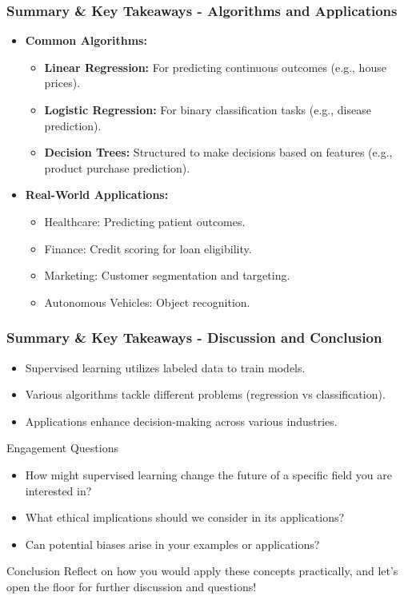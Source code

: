 \documentclass[aspectratio=169]{beamer}
\begin{document}
\begin{frame}[fragile]
    \frametitle{Summary \& Key Takeaways - Algorithms and Applications}
    \begin{itemize}
        \item \textbf{Common Algorithms:}
        \begin{itemize}
            \item \textbf{Linear Regression:} For predicting continuous outcomes (e.g., house prices).
            \item \textbf{Logistic Regression:} For binary classification tasks (e.g., disease prediction).
            \item \textbf{Decision Trees:} Structured to make decisions based on features (e.g., product purchase prediction).
        \end{itemize}
        
        \item \textbf{Real-World Applications:}
        \begin{itemize}
            \item Healthcare: Predicting patient outcomes.
            \item Finance: Credit scoring for loan eligibility.
            \item Marketing: Customer segmentation and targeting.
            \item Autonomous Vehicles: Object recognition.
        \end{itemize}
    \end{itemize}
\end{frame}

\begin{frame}[fragile]
    \frametitle{Summary \& Key Takeaways - Discussion and Conclusion}
    \begin{itemize}
        \item Supervised learning utilizes labeled data to train models.
        \item Various algorithms tackle different problems (regression vs classification).
        \item Applications enhance decision-making across various industries.
    \end{itemize}
    
    \begin{block}{Engagement Questions}
        \begin{itemize}
            \item How might supervised learning change the future of a specific field you are interested in?
            \item What ethical implications should we consider in its applications?
            \item Can potential biases arise in your examples or applications?
        \end{itemize}
    \end{block}
    
    \begin{block}{Conclusion}
        Reflect on how you would apply these concepts practically, and let's open the floor for further discussion and questions!
    \end{block}
\end{frame}
\end{document}
